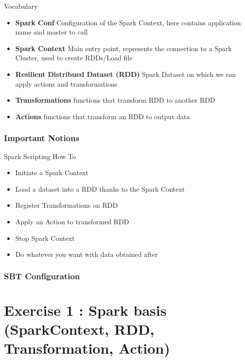 \documentclass[slidetop,9pt,utf8]{beamer}
\begin{document}
\begin{CJK}{UTF8}{gbsn}
\begin{frame}
  \begin{block}{Vocabulary}
    \begin{itemize}
      \item \textbf{Spark Conf} Configuration of the Spark Context, here contains application name and master to call
      \item \textbf{Spark Context} Main entry point, represents the connection to a Spark Cluster, used to create RDDs/Load file
      \item \textbf{Resilient Distribued Dataset (RDD)} Spark Dataset on which we can apply actions and transformations
      \item \textbf{Transformations} functions that transform RDD to another RDD
      \item \textbf{Actions} functions that transform an RDD to output data
    \end{itemize}
  \end{block}

\end{frame}

\begin{frame}
  \frametitle{Important Notions}

  \begin{block}{Spark Scripting How To}
    \begin{itemize}
      \item Initiate a Spark Context
      \item Load a dataset into a RDD thanks to the Spark Context
      \item Register Transformations on RDD
      \item Apply an Action to transformed RDD
      \item Stop Spark Context
      \item Do whatever you want with data obtained after 
    \end{itemize}
  \end{block}

\end{frame}

\begin{frame}
  \frametitle{SBT Configuration}

  

\end{frame}

\section{Exercise 1 : Spark basis (SparkContext, RDD, Transformation, Action)}


\end{CJK}
\end{document}
